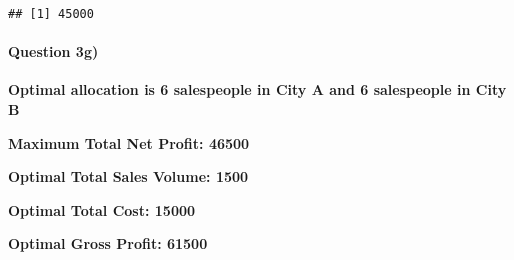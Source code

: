 \documentclass[]{article}
\let\oldparagraph\paragraph
\renewcommand{\paragraph}[1]{\oldparagraph{#1}\mbox{}}
\begin{document}
\begin{verbatim}
## [1] 45000
\end{verbatim}

\hypertarget{question-3g}{%
\paragraph{Question 3g)}\label{question-3g}}

\textbf{Optimal allocation is 6 salespeople in City A and 6 salespeople
in City B}

\textbf{Maximum Total Net Profit: 46500}

\textbf{Optimal Total Sales Volume: 1500}

\textbf{Optimal Total Cost: 15000}

\textbf{Optimal Gross Profit: 61500}
\end{document}
